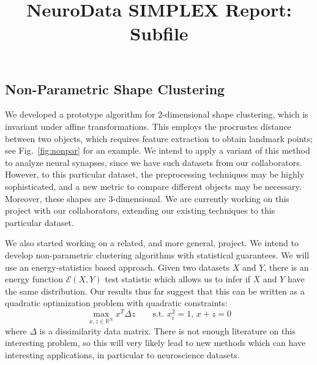 \documentclass[simplex.tex]{subfiles}
\title{NeuroData SIMPLEX Report: Subfile}
\begin{document}

\subsection{Non-Parametric Shape Clustering}

We developed a prototype algorithm for 2-dimensional shape clustering, which
is invariant under affine transformations. This employs the procrustes
distance between two objects, which requires feature extraction to obtain
landmark points; see Fig.~\ref{fig:nonpar} for an example. 
We intend to apply a variant of this method to analyze neural synapses,
since we have such datasets from our collaborators. However, to this particular
dataset, the preprocessing techniques may be highly sophisticated, and a new
metric to compare different objects may be necessary. Moreover, these shapes are
3-dimensional. We are currently working on this project
with our collaborators, extending our existing  techniques to this 
particular dataset.

We also started working on a related, and more general, project.
We intend to develop non-parametric clustering algorithms with statistical
guarantees. We will use an energy-statistics based approach. Given
two datasets $X$ and $Y$, there is an energy function $\mathcal{E}(X,Y)$
test statistic which allows us to infer if $X$ and $Y$ have the same
distribution. Our results thus far suggest that this can be written
as a quadratic optimization problem
with quadratic constraints: 
\begin{equation}
\max_{x,z\in \mathbb{R}^N} x^T \Delta z \qquad \mbox{s.t. $x_i^2=1$, $x+z = 0$}
\end{equation}
where $\Delta$ is a dissimilarity data matrix.
There is not enough literature on
this interesting problem, so this will very likely lead to new methods which
can have interesting applications, in particular to neuroscience datasets.
\end{document}
